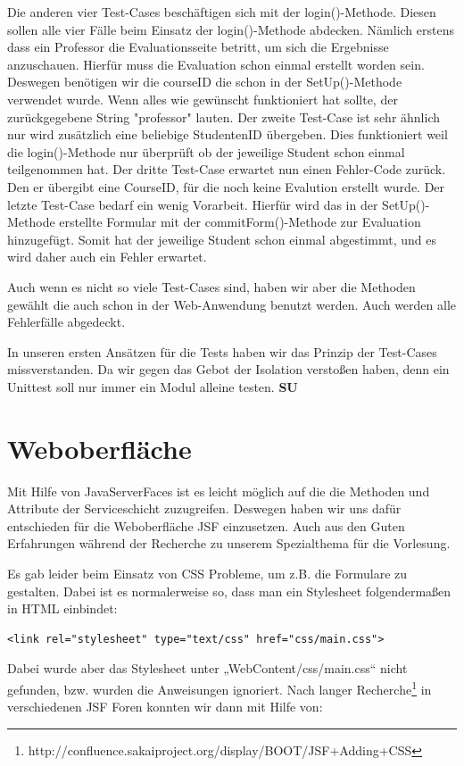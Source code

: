 \documentclass[titlepage, 12pt,a4paper]{scrartcl}
\begin{document}
Die anderen vier Test-Cases beschäftigen sich mit der login()-Methode. Diesen sollen
alle vier Fälle beim Einsatz der login()-Methode abdecken. Nämlich erstens dass ein Professor die 
Evaluationsseite betritt, um sich die Ergebnisse anzuschauen. Hierfür muss die Evaluation schon
einmal erstellt worden sein. Deswegen benötigen wir die courseID die schon in der SetUp()-Methode
verwendet wurde. Wenn alles wie gewünscht funktioniert hat sollte, der zurückgegebene String "professor" lauten.
Der zweite Test-Case ist sehr ähnlich nur wird zusätzlich eine beliebige StudentenID übergeben. Dies funktioniert
weil die login()-Methode nur überprüft ob der jeweilige Student schon einmal teilgenommen hat.
Der dritte Test-Case erwartet nun einen Fehler-Code zurück. Den er übergibt eine CourseID, für die noch keine
Evalution erstellt wurde. Der letzte Test-Case bedarf ein wenig Vorarbeit. Hierfür wird das in der SetUp()-Methode
erstellte Formular mit der commitForm()-Methode zur Evaluation hinzugefügt. Somit hat der jeweilige Student schon
einmal abgestimmt, und es wird daher auch ein Fehler erwartet.

Auch wenn es nicht so viele Test-Cases sind, haben wir aber die Methoden gewählt die auch schon in der Web-Anwendung
benutzt werden. Auch werden alle Fehlerfälle abgedeckt.

In unseren ersten Ansätzen für die Tests haben wir das Prinzip der Test-Cases missverstanden. Da wir gegen das
Gebot der Isolation verstoßen haben, denn ein Unittest soll nur immer ein Modul alleine testen.
{\bf{SU}}

\section{Weboberfläche}
Mit Hilfe von JavaServerFaces ist es leicht möglich auf die die Methoden und
Attribute der Serviceschicht zuzugreifen. Deswegen haben wir uns dafür
entschieden für die Weboberfläche JSF einzusetzen. Auch aus den Guten
Erfahrungen während der Recherche zu unserem Spezialthema für die Vorlesung. 

Es gab leider beim Einsatz von CSS Probleme, um z.B. die Formulare zu
gestalten. Dabei ist es normalerweise so, dass man ein Stylesheet
folgendermaßen in HTML einbindet:

\begin{lstlisting}
<link rel="stylesheet" type="text/css" href="css/main.css">
\end{lstlisting}

Dabei wurde aber das Stylesheet unter „WebContent/css/main.css“ nicht gefunden,
bzw. wurden die Anweisungen ignoriert. Nach langer
Recherche\footnote{http://confluence.sakaiproject.org/display/BOOT/JSF+Adding+CSS} in verschiedenen JSF Foren konnten wir dann mit Hilfe von:
\end{document}
